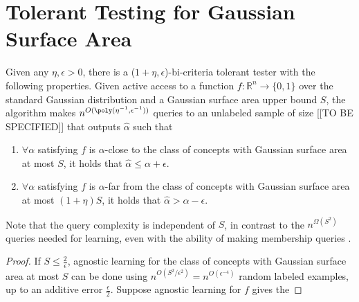 \section{Tolerant Testing for Gaussian Surface Area}
\label{sec:surface}
\begin{theorem}
Given any $\eta,\epsilon>0$, there is a ($1+\eta,\epsilon$)-bi-criteria tolerant tester with the following properties. Given active access to a function $f:\mathbb{R}^n\rightarrow\{0,1\}$ over the standard Gaussian distribution and a Gaussian surface area upper bound $S$, the algorithm makes $n^{O(\poly(\eta^{-1},\epsilon^{-1}))}$ queries to an unlabeled sample of size [[TO BE SPECIFIED]] that outputs $\hat \alpha$ such that
\begin{enumerate}
\item $\forall \alpha$ satisfying $f$ is $\alpha$-close to the class of concepts with Gaussian surface area at most $S$, it holds that $\hat\alpha\leq \alpha+\epsilon$.
\item $\forall \alpha$ satisfying $f$ is $\alpha$-far from the class of concepts with Gaussian surface area at most $(1+\eta)S$, it holds that $\hat\alpha>\alpha-\epsilon$.
\end{enumerate}
Note that the query complexity is independent of $S$, in contrast to the $n^{\Omega(S^2)}$ queries needed for learning, even with the ability of making membership queries \citep{KOS08}.
\end{theorem}

\begin{proof}
If $S\leq\frac{2}{\epsilon}$, agnostic learning for the class of concepts with Gaussian surface area at most $S$ can be done using $n^{O(S^2/\epsilon^2)}=n^{O(\epsilon^{-4})}$ random labeled examples, up to an additive error $\frac{\epsilon}{2}$. Suppose agnostic learning for $f$ gives the 
\end{proof}


